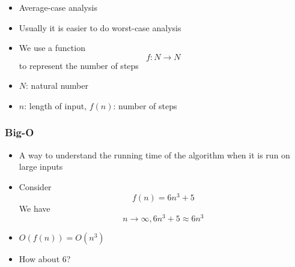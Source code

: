 \begin{frame}[allowframebreaks]
\begin{itemize}
\item Average-case analysis
\item Usually it is easier to do worst-case analysis
\item We use a function
  \begin{equation*}
  f: N \rightarrow N
\end{equation*}
to represent the number of steps
\item [] $N$: natural number

\item [] $n$: length of input, $f(n)$: number of steps

\end{itemize}\end{frame} \begin{frame}[allowframebreaks] \frametitle{Big-O}
  \begin{itemize}
  \item
A way to understand the running time of the algorithm when
it is run on large inputs
\item Consider
  \begin{equation*}
  f(n)=6n^3 + 5
\end{equation*}
  We have
  \begin{equation*}
n \rightarrow \infty, 6n^3 + 5 \approx 6n^3
\end{equation*}
\item $O(f(n))=O(n^3)$

\item [] How about 6?


\end{itemize}
\end{frame}

